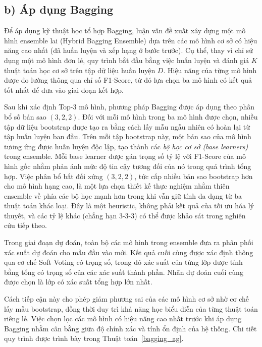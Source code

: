 \pagebreak
 
\subsection*{b) Áp dụng Bagging}
Để áp dụng kỹ thuật học tổ hợp Bagging, luận văn đề xuất xây dựng một mô hình ensemble lai (Hybrid Bagging Ensemble) dựa trên các mô hình cơ sở có hiệu năng cao nhất (đã huấn luyện và xếp hạng ở bước trước). Cụ thể, thay vì chỉ sử dụng một mô hình đơn lẻ, quy trình bắt đầu bằng việc huấn luyện và đánh giá $K$ thuật toán học cơ sở trên tập dữ liệu huấn luyện $D$. Hiệu năng của từng mô hình được đo lường thông qua chỉ số F1-Score, từ đó lựa chọn ba mô hình có kết quả tốt nhất để đưa vào giai đoạn kết hợp.

Sau khi xác định Top-3 mô hình, phương pháp Bagging được áp dụng theo phân bổ số bản sao $(3,2,2)$. Đối với mỗi mô hình trong ba mô hình được chọn, nhiều tập dữ liệu bootstrap được tạo ra bằng cách lấy mẫu ngẫu nhiên có hoàn lại từ tập huấn luyện ban đầu. Trên mỗi tập bootstrap này, một bản sao của mô hình tương ứng được huấn luyện độc lập, tạo thành các \textit{bộ học cơ sở (base learners)} trong ensemble. Mỗi base learner được gán trọng số tỷ lệ với F1-Score của mô hình gốc nhằm phản ánh mức độ tin cậy tương đối của nó trong quá trình tổng hợp. Việc phân bổ bất đối xứng $(3,2,2)$, tức cấp nhiều bản sao bootstrap hơn cho mô hình hạng cao, là một lựa chọn thiết kế thực nghiệm nhằm thiên ensemble về phía các bộ học mạnh hơn trong khi vẫn giữ tính đa dạng từ ba thuật toán khác loại. Đây là một heuristic, không phải kết quả của tối ưu hóa lý thuyết, và các tỷ lệ khác (chẳng hạn $3$-$3$-$3$) có thể được khảo sát trong nghiên cứu tiếp theo.

Trong giai đoạn dự đoán, toàn bộ các mô hình trong ensemble đưa ra phân phối xác suất dự đoán cho mẫu đầu vào mới. Kết quả cuối cùng được xác định thông qua cơ chế Soft Voting có trọng số, trong đó xác suất của từng lớp được tính bằng tổng có trọng số của các xác suất thành phần. Nhãn dự đoán cuối cùng được chọn là lớp có xác suất tổng hợp lớn nhất.

Cách tiếp cận này cho phép giảm phương sai của các mô hình cơ sở nhờ cơ chế lấy mẫu bootstrap, đồng thời duy trì khả năng học biểu diễn của từng thuật toán riêng lẻ. Việc chọn lọc các mô hình có hiệu năng cao nhất trước khi áp dụng Bagging nhằm cân bằng giữa độ chính xác và tính ổn định của hệ thống. Chi tiết quy trình được trình bày trong Thuật toán~\ref{bagging_ag}.

